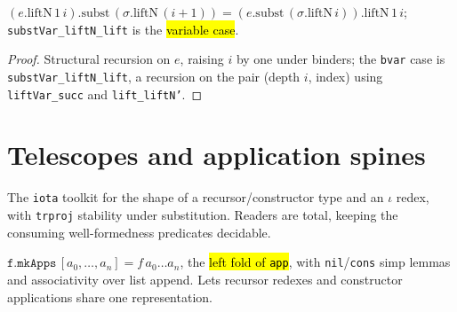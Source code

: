 \begin{lemma}
\label{thm:liftn-subst-liftn}
\leanok
{} 

$(e.\mathrm{liftN}\,1\,i).\mathrm{subst}\,(\sigma.\mathrm{liftN}\,(i{+}1)) = (e.\mathrm{subst}\,(\sigma.\mathrm{liftN}\,i)).\mathrm{liftN}\,1\,i$;
\texttt{substVar\_liftN\_lift} is the \hl{variable case}.
\end{lemma}
\begin{proof}
\leanok
{} Structural recursion on $e$, raising $i$ by one under binders; the
\texttt{bvar} case is \texttt{substVar\_liftN\_lift}, a recursion on the pair (depth $i$,
index) using \texttt{liftVar\_succ} and \texttt{lift\_liftN'}.
\end{proof}

\section{Telescopes and application spines}

The \texttt{iota} toolkit for the shape of a recursor/constructor type and an $\iota$
redex, with \texttt{trproj} stability under substitution. Readers are total, keeping the
consuming well-formedness predicates decidable.

\begin{definition}
\label{def:mkapps}
\leanok
{} 

 $\texttt{f.mkApps}\,[a_0,\dots,a_n] = f\,a_0\dots a_n$, the \hl{left fold
of \texttt{app}}, with \texttt{nil}/\texttt{cons} simp lemmas and associativity over list
append.
Lets recursor redexes and constructor applications share one representation.
\end{definition}

